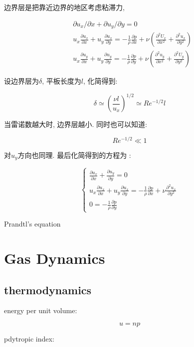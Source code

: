 \documentclass[fontset=windows]{report}
\begin{document}
边界层是把靠近边界的地区考虑粘滞力,

\begin{equation}
  \begin{aligned}
  &\partial u_{x} / \partial x+\partial u_{y} / \partial y=0 \\
  &u_{x} \frac{\partial u_{x}}{\partial x}+u_{y} \frac{\partial u_{x}}{\partial y}=
  -\frac{1}{\rho} \frac{\partial p}{\partial x}
  +\nu\left(\frac{\partial^{2} U_{x}}{\partial x^{2}}
  +\frac{\partial^{2} u_{x}}{\partial y^{2}}\right) \\
  &u_{x} \frac{\partial u_{y}}{\partial x}+u_{y} \frac{\partial u_{y}}{\partial y}
  =-\frac{1}{\rho} \frac{\partial p}{\partial y}
  +\nu\left(\frac{\partial^{2} u_{y}}{\partial x^{2}}
  +\frac{\partial^{2} U_{y}}{\partial y^{2}}\right)
  \end{aligned}
\end{equation}

设边界层为\(\delta\), 平板长度为\(l\), 化简得到:

\[\delta\simeq \left(
\frac{\nu l}{u_x}
\right)^{1/2}\simeq Re^{-1/2}l\]

当雷诺数越大时, 边界层越小. 同时也可以知道:

\[Re^{-1/2}\ll 1\]

对\(u_y\)方向也同理. 最后化简得到的方程为 :

\[\left\{\begin{array}{l}\frac{\partial u_{x}}{\partial x}+\frac{\partial u_{y}}{\partial y}=0 \\u_{x} \frac{\partial u_{x}}{\partial x}+u_{y} \frac{\partial u_{x}}{\partial y}=-\frac{1}{\rho} \frac{\partial p}{\partial x}+\nu \frac{\partial^{2} u_{x}}{\partial y^{2}} \\0=-\frac{1}{\rho} \frac{\partial p}{\partial y}\end{array}\right.\]

Prandtl's equation



\chapter{Gas Dynamics}
\section{thermodynamics}

energy per unit volume:

\[u = np\]

pdytropic index:
\end{document}
